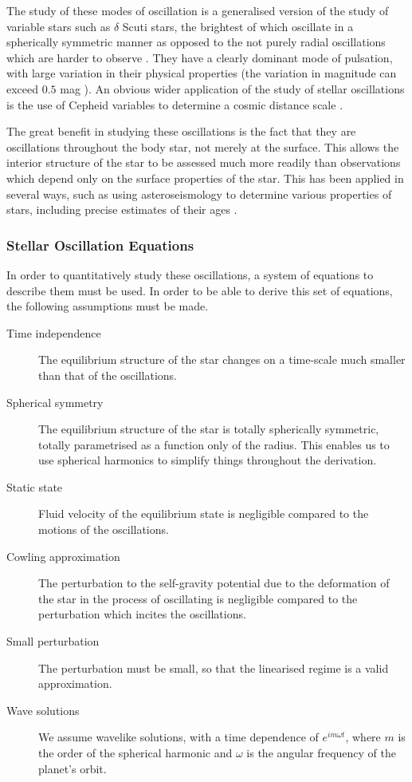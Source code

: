 \documentclass[11pt]{amsart}
\begin{document}
The study of these modes of oscillation is a generalised version of the study of variable stars such as $\delta$ Scuti stars, the brightest of which oscillate in a spherically symmetric manner as opposed to the not purely radial oscillations which are harder to observe \cite{Garg2010}.  They have a clearly dominant mode of pulsation, with large variation in their physical properties (the variation in magnitude can exceed $0.5$ mag \cite{Garg2010}).  An obvious wider application of the study of stellar oscillations is the use of Cepheid variables to determine a cosmic distance scale \cite{Madore1991}.

The great benefit in studying these oscillations is the fact that they are oscillations throughout the body star, not merely at the surface.  This allows the interior structure of the star to be assessed much more readily than observations which depend only on the surface properties of the star.  This has been applied in several ways, such as using asteroseismology to determine various properties of stars, including precise estimates of their ages \cite{Chaplin2013} \cite{Cunha2007}.

\subsubsection{Stellar Oscillation Equations}

In order to quantitatively study these oscillations, a system of equations to describe them must be used.  In order to be able to derive this set of equations, the following assumptions must be made.

\begin{description}
\item[Time independence]
 The equilibrium structure of the star changes on a time-scale much smaller than that of the oscillations.
 
 \item[Spherical symmetry]
 The equilibrium structure of the star is totally spherically symmetric, totally parametrised as a function only of the radius.  This enables us to use spherical harmonics to simplify things throughout the derivation.
 
 \item[Static state]
 Fluid velocity of the equilibrium state is negligible compared to the motions of the oscillations.
 
 \item[Cowling approximation]
 The perturbation to the self-gravity potential due to the deformation of the star in the process of oscillating is negligible compared to the perturbation which incites the oscillations.
 
 \item[Small perturbation]
 The perturbation must be small, so that the linearised regime is a valid approximation.
 
 \item[Wave solutions]
 We assume wavelike solutions, with a time dependence of $e^{i m \omega t}$, where $m$ is the order of the spherical harmonic and $\omega$ is the angular frequency of the planet's orbit.
\end{description}
\end{document}
